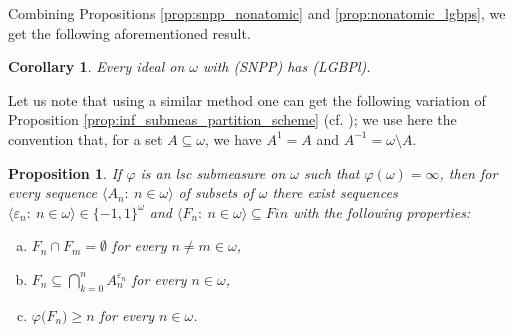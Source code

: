 \documentclass[a4paper,11pt,fleqn]{amsart}
\newtheorem{proposition}[theorem]{Proposition}
\newtheorem{corollary}[theorem]{Corollary}
\theoremstyle{definition}
\theoremstyle{remark}
\numberwithin{equation}{section}
\newcommand{\eps}{\varepsilon}
\newcommand{\N}{\mathbb{N}}
\newcommand{\sm}{\setminus}
\newcommand{\sub}{\subseteq}
\newcommand{\seqn}[1]{\big\langle#1\colon\ n\io\big\rangle}
\newcommand{\io}{\in\omega}%
\begin{document}
Combining Propositions \ref{prop:snpp_nonatomic} and \ref{prop:nonatomic_lgbps}, we get the following aforementioned result.

\begin{corollary}\label{cor:snpp_lgbps}
     Every ideal on $\omega$ with (SNPP) has (LGBPl).
\end{corollary}

Let us note that using a similar method one can get the following variation of Proposition \ref{prop:inf_submeas_partition_scheme} (cf. \cite[Lemma 3.17]{HHH07}); we use here the convention that, for a set $A\sub\omega$, we have $A^1=A$ and $A^{-1}=\omega\sm A$.

\begin{proposition}\label{prop:inf_submeas_scheme}
If $\varphi$ is an lsc submeasure on $\omega$ such that $\varphi(\omega)=\infty$, then for every sequence $\seqn{A_n}$ of subsets of $\omega$ there exist sequences $\seqn{\eps_n}\in\{-1,1\}^\omega$ and $\seqn{F_n}\sub Fin$ with the following properties:
\begin{enumerate}[(a)]
\item $F_n\cap F_m=\emptyset$ for every $n\neq m\io$,
\item $F_n\sub\bigcap_{k=0}^n A_n^{\eps_n}$ for every $n\io$,
\item $\varphi\big(F_n\big)\geq n$ for every $n\io$.
\end{enumerate}
\end{proposition}



\end{document}

